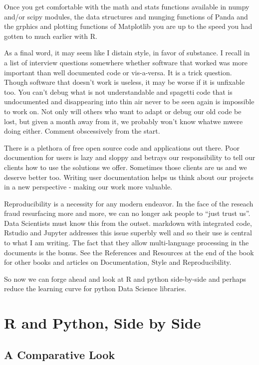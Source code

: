 \documentclass[]{book}
\theoremstyle{definition}
\theoremstyle{definition}
\theoremstyle{definition}
\theoremstyle{remark}
\begin{document}
Once you get comfortable with the math and stats functions available in
numpy and/or scipy modules, the data structures and munging functions of
Panda and the grphics and plotting functions of Matplotlib you are up to
the speed you had gotten to much earlier with R.

As a final word, it may seem like I distain style, in favor of
substance. I recall in a list of interview questions somewhere whether
software that worked was more important than well documented code or
vis-a-versa. It is a trick question. Though software that doesn't work
is useless, it may be worse if it is unfixable too. You can't debug what
is not understandable and spagetti code that is undocumented and
disappearing into thin air never to be seen again is impossible to work
on. Not only will others who want to adapt or debug our old code be
lost, but given a month away from it, we probably won't know whatwe
mwere doing either. Comment obscessively from the start.

There is a plethora of free open source code and applications out there.
Poor documention for users is lazy and sloppy and betrays our
responsibility to tell our clients how to use the solutions we offer.
Sometimes those clients are us and we deserve better too. Writing user
documentation helps us think about our projects in a new perspective -
making our work more valuable.

Reproducibility is a necessity for any modern endeavor. In the face of
the reseach fraud resurfacing more and more, we can no longer ask people
to ``just trust us''. Data Scientists must know this from the outset.
markdown with integrated code, Rstudio and Jupyter addresses this issue
superbly well and so their use is central to what I am writing. The fact
that they allow multi-language processing in the documents is the bonus.
See the References and Resources at the end of the book for other books
and articles on Documentation, Style and Reproducibility.

So now we can forge ahead and look at R and python side-by-side and
perhaps reduce the learning curve for python Data Science libraries.

\part{R and Python, Side by
Side}\label{part-r-and-python-side-by-side}

\chapter{A Comparative Look}\label{a-comparative-look}
\end{document}
